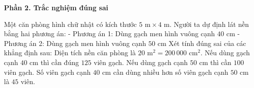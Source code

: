 \textbf{Phần 2. Trắc nghiệm đúng sai}

\begin{ex} %
Một căn phòng hình chữ nhật có kích thước $5\text{ m} \times 4\text{ m}$. Người ta dự định lát nền bằng hai phương án:
- Phương án 1: Dùng gạch men hình vuông cạnh $40\text{ cm}$
- Phương án 2: Dùng gạch men hình vuông cạnh $50\text{ cm}$
Xét tính đúng sai của các khẳng định sau:
\choiceTF
{\True Diện tích nền căn phòng là $20\text{ m}^2 = 200\,000\text{ cm}^2$.}
{\True Nếu dùng gạch cạnh $40\text{ cm}$ thì cần đúng $125$ viên gạch.}
{Nếu dùng gạch cạnh $50\text{ cm}$ thì cần $100$ viên gạch.}
{\True Số viên gạch cạnh $40\text{ cm}$ cần dùng nhiều hơn số viên gạch cạnh $50\text{ cm}$ là $45$ viên.}
\end{ex}

